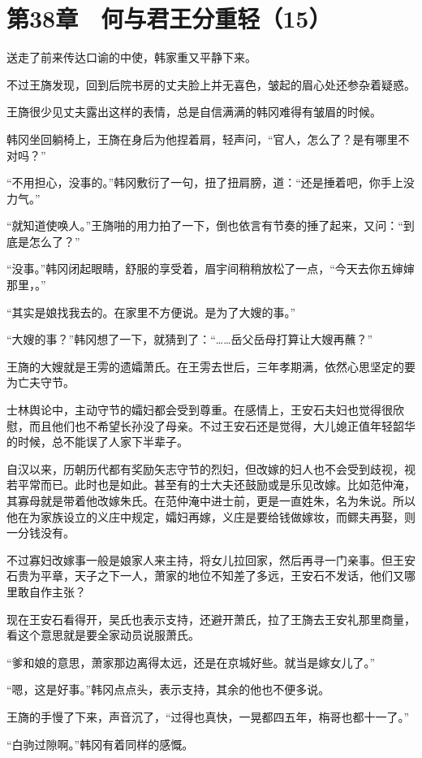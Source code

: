 \section{第38章　何与君王分重轻（15）}

送走了前来传达口谕的中使，韩家重又平静下来。

不过王旖发现，回到后院书房的丈夫脸上并无喜色，皱起的眉心处还参杂着疑惑。

王旖很少见丈夫露出这样的表情，总是自信满满的韩冈难得有皱眉的时候。

韩冈坐回躺椅上，王旖在身后为他捏着肩，轻声问，“官人，怎么了？是有哪里不对吗？”

“不用担心，没事的。”韩冈敷衍了一句，扭了扭肩膀，道：“还是捶着吧，你手上没力气。”

“就知道使唤人。”王旖啪的用力拍了一下，倒也依言有节奏的捶了起来，又问：“到底是怎么了？”

“没事。”韩冈闭起眼睛，舒服的享受着，眉宇间稍稍放松了一点，“今天去你五婶婶那里，。”

“其实是娘找我去的。在家里不方便说。是为了大嫂的事。”

“大嫂的事？”韩冈想了一下，就猜到了：“……岳父岳母打算让大嫂再蘸？”

王旖的大嫂就是王雱的遗孀萧氏。在王雱去世后，三年孝期满，依然心思坚定的要为亡夫守节。

士林舆论中，主动守节的孀妇都会受到尊重。在感情上，王安石夫妇也觉得很欣慰，而且他们也不希望长孙没了母亲。不过王安石还是觉得，大儿媳正值年轻韶华的时候，总不能误了人家下半辈子。

自汉以来，历朝历代都有奖励矢志守节的烈妇，但改嫁的妇人也不会受到歧视，视若平常而已。此时也是如此。甚至有的士大夫还鼓励或是乐见改嫁。比如范仲淹，其寡母就是带着他改嫁朱氏。在范仲淹中进士前，更是一直姓朱，名为朱说。所以他在为家族设立的义庄中规定，孀妇再嫁，义庄是要给钱做嫁妆，而鳏夫再娶，则一分钱没有。

不过寡妇改嫁事一般是娘家人来主持，将女儿拉回家，然后再寻一门亲事。但王安石贵为平章，天子之下一人，萧家的地位不知差了多远，王安石不发话，他们又哪里敢自作主张？

现在王安石看得开，吴氏也表示支持，还避开萧氏，拉了王旖去王安礼那里商量，看这个意思就是要全家动员说服萧氏。

“爹和娘的意思，萧家那边离得太远，还是在京城好些。就当是嫁女儿了。”

“嗯，这是好事。”韩冈点点头，表示支持，其余的他也不便多说。

王旖的手慢了下来，声音沉了，“过得也真快，一晃都四五年，栴哥也都十一了。”

“白驹过隙啊。”韩冈有着同样的感慨。

